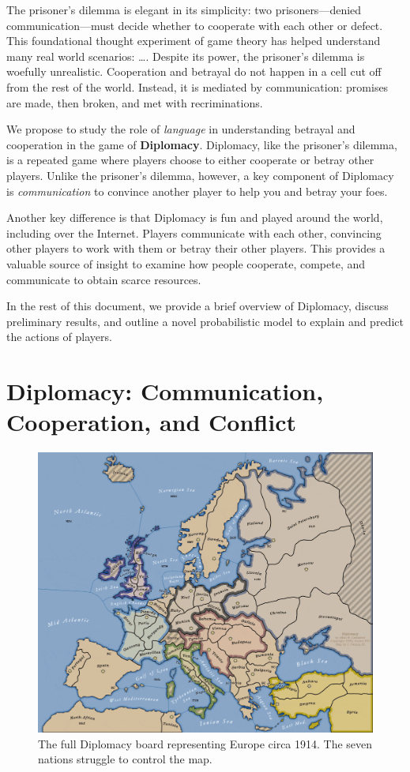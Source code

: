 \documentclass[11pt,letterpaper]{article}
\begin{document}
The prisoner's dilemma is elegant in its simplicity: two
prisoners---denied communication---must decide whether to cooperate
with each other or defect.  This foundational thought experiment of
game theory has helped understand many real world scenarios: \dots .
Despite its power, the prisoner's dilemma is woefully unrealistic.
Cooperation and betrayal do not happen in a cell cut off from the rest
of the world.  Instead, it is mediated by communication: promises are
made, then broken, and met with recriminations.

We propose to study the role of \emph{language} in understanding
betrayal and cooperation in the game of {\bf Diplomacy}.  Diplomacy,
like the prisoner's dilemma, is a repeated game where players choose
to either cooperate or betray other players.  Unlike the prisoner's
dilemma, however, a key component of Diplomacy is \emph{communication}
to convince another player to help you and betray your foes.

Another key difference is that Diplomacy is fun and played around the
world, including over the Internet.  Players communicate with each
other, convincing other players to work with them or betray their
other players.  This provides a valuable source of insight to examine
how people cooperate, compete, and communicate to obtain scarce
resources.

In the rest of this document, we provide a brief overview of
Diplomacy, discuss preliminary results, and outline a novel
probabilistic model to explain and predict the actions of players.

\section{Diplomacy: Communication, Cooperation, and Conflict}

\begin{figure}
  \begin{center}
  \includegraphics[width=\linewidth]{figures/full_map}
  \end{center}
  \caption{The full Diplomacy board representing Europe circa 1914.
    The seven nations struggle to control the map.}
  \label{fig:board}
\end{figure}
\end{document}
